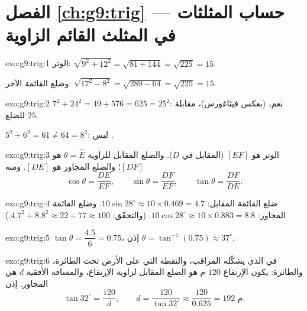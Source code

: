 \section*{الفصل \ref{ch:g9:trig} --- حساب المثلثات في المثلث القائم الزاوية}

\begin{solution}{exo:g9:trig:1}
الوتر: $\sqrt{9^2 + 12^2} = \sqrt{81 + 144} = \sqrt{225} = 15$.

وضلع القائمة الآخر: $\sqrt{17^2 - 8^2} = \sqrt{289 - 64} = \sqrt{225} = 15$.
\end{solution}

\begin{solution}{exo:g9:trig:2}
$7^2 + 24^2 = 49 + 576 = 625 = 25^2$: نعم،  (بعكس
فيثاغورس)،  مقابلة للضلع $25$.

$5^2 + 6^2 = 61 \neq 64 = 8^2$: ليس .
\end{solution}

\begin{solution}{exo:g9:trig:3}
الوتر هو $[EF]$ (المقابل  في $D$). والضلع
المقابل للزاوية $\theta = \widehat E$ هو $[DF]$؛ والضلع المجاور
هو $[DE]$. ومنه
\[
\cos\theta = \frac{DE}{EF}, \qquad
\sin\theta = \frac{DF}{EF}, \qquad
\tan\theta = \frac{DF}{DE}.
\]
\end{solution}

\begin{solution}{exo:g9:trig:4}
ضلع القائمة المقابل: $10 \sin 28^\circ \approx 10 \times 0.469 = 4.7$.
وضلع القائمة المجاور: $10 \cos 28^\circ \approx 10 \times 0.883 = 8.8$.
(والتحقّق: $4.7^2 + 8.8^2 \approx 22 + 77 \approx 100$.)
\end{solution}

\begin{solution}{exo:g9:trig:5}
$\tan\theta = \dfrac{4.5}{6} = 0.75$، إذن
$\theta = \tan^{-1}(0.75) \approx 37^\circ$.
\end{solution}

\begin{solution}{exo:g9:trig:6}
في  الذي يشكّله المراقب، والنقطة التي على
الأرض تحت الطائرة، والطائرة: يكون الاِرتفاع $120$ م هو الضلع
المقابل لزاوية الاِرتفاع، والمسافة الأفقية $d$ هي المجاور.
إذن
\[
\tan 32^\circ = \frac{120}{d},
\qquad
d = \frac{120}{\tan 32^\circ} \approx \frac{120}{0.625} = 192 \text{ م}.
\]
\end{solution}

